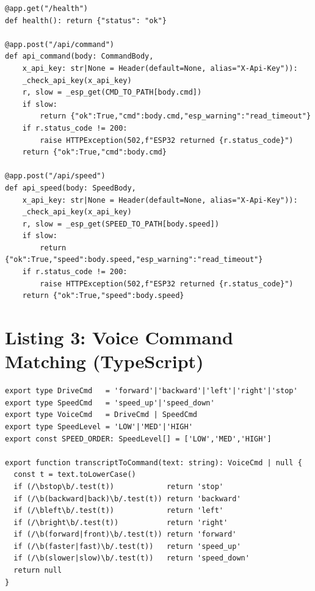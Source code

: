 \documentclass[12pt]{report}
\begin{document}
\begin{lstlisting}[style=python,
caption={FastAPI bridge --- authenticates and forwards commands to the ESP32.}]
@app.get("/health")
def health(): return {"status": "ok"}

@app.post("/api/command")
def api_command(body: CommandBody,
    x_api_key: str|None = Header(default=None, alias="X-Api-Key")):
    _check_api_key(x_api_key)
    r, slow = _esp_get(CMD_TO_PATH[body.cmd])
    if slow:
        return {"ok":True,"cmd":body.cmd,"esp_warning":"read_timeout"}
    if r.status_code != 200:
        raise HTTPException(502,f"ESP32 returned {r.status_code}")
    return {"ok":True,"cmd":body.cmd}

@app.post("/api/speed")
def api_speed(body: SpeedBody,
    x_api_key: str|None = Header(default=None, alias="X-Api-Key")):
    _check_api_key(x_api_key)
    r, slow = _esp_get(SPEED_TO_PATH[body.speed])
    if slow:
        return {"ok":True,"speed":body.speed,"esp_warning":"read_timeout"}
    if r.status_code != 200:
        raise HTTPException(502,f"ESP32 returned {r.status_code}")
    return {"ok":True,"speed":body.speed}
\end{lstlisting}

\section*{Listing 3: Voice Command Matching (TypeScript)}

\begin{lstlisting}[style=typescript,
caption={commands.ts --- maps speech transcript to drive and speed commands.}]
export type DriveCmd   = 'forward'|'backward'|'left'|'right'|'stop'
export type SpeedCmd   = 'speed_up'|'speed_down'
export type VoiceCmd   = DriveCmd | SpeedCmd
export type SpeedLevel = 'LOW'|'MED'|'HIGH'
export const SPEED_ORDER: SpeedLevel[] = ['LOW','MED','HIGH']

export function transcriptToCommand(text: string): VoiceCmd | null {
  const t = text.toLowerCase()
  if (/\bstop\b/.test(t))            return 'stop'
  if (/\b(backward|back)\b/.test(t)) return 'backward'
  if (/\bleft\b/.test(t))            return 'left'
  if (/\bright\b/.test(t))           return 'right'
  if (/\b(forward|front)\b/.test(t)) return 'forward'
  if (/\b(faster|fast)\b/.test(t))   return 'speed_up'
  if (/\b(slower|slow)\b/.test(t))   return 'speed_down'
  return null
}
\end{lstlisting}
\end{document}
